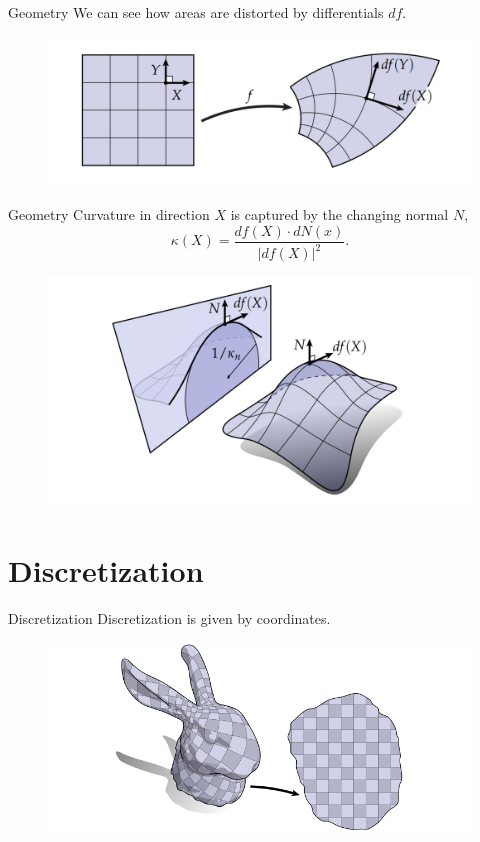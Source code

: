 \documentclass[UKenglish]{beamer}
\begin{document}
\begin{frame}{Geometry}
    We can see how areas are distorted by differentials $df$.
    \vspace*{1cm}
    \begin{figure}
        \centering
        \includegraphics[width=.8\textwidth]{Figures/geometry_differentials.png}
    \end{figure}
\end{frame}

\begin{frame}{Geometry}
    Curvature in direction $X$ is captured by the changing normal $N$,
    \[
        \kappa(X)=\frac{df(X)\cdot dN(x)}{|df(X)|^2}.
    \]
        \vspace*{.25cm}
    \begin{figure}
        \centering
        \includegraphics[width=.7\textwidth]{Figures/geometry_curvature.png}
    \end{figure}
\end{frame}

\section{Discretization}

\begin{frame}{Discretization}
    Discretization is given by coordinates.
    \vfill
    \begin{figure}
        \centering
        \includegraphics[width=.9\textwidth]{Figures/bunny_map.png}
    \end{figure}
\end{frame}
\end{document}
